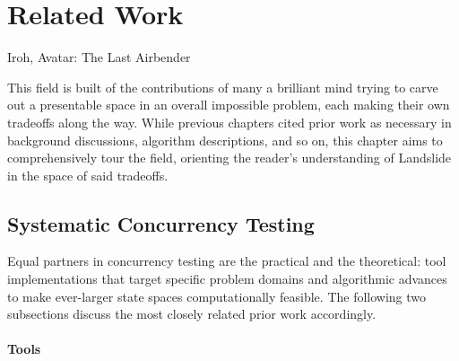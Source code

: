 \chapter{Related Work}
\label{chap:relatedwork}

{Iroh, Avatar: The Last Airbender}

This field is built of the contributions of many a brilliant mind
trying to carve out a presentable space in an overall impossible problem,
each making their own tradeoffs along the way.
While previous chapters cited prior work as necessary in background discussions, algorithm descriptions, and so on,
this chapter aims to comprehensively tour the field,
orienting the reader's understanding of Landslide in the space of said tradeoffs.

\section{Systematic Concurrency Testing}

Equal partners in concurrency testing are the practical and the theoretical:
tool implementations that target specific problem domains
and algorithmic advances to make ever-larger state spaces computationally feasible.
The following two subsections discuss the most closely related prior work accordingly.

\subsubsection{Tools}

